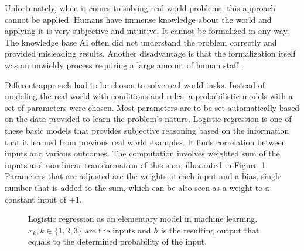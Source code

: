 Unfortunately, when it comes to solving real world problems, this approach cannot be applied. Humans have immense knowledge about the world and applying it is very subjective and intuitive. It cannot be formalized in any way. The knowledge base AI often did not understand the problem correctly and provided misleading results. Another disadvantage is that the formalization itself was an unwieldy process requiring a large amount of human staff \cite{Goodfellow-et-al-2016}.

Different approach had to be chosen to solve real world tasks. Instead of modeling the real world with conditions and rules, a probabilistic models with a set of parameters were chosen. Most parameters are to be set automatically based on the data provided to learn the problem's nature. Logistic regression is one of these basic models that provides subjective reasoning based on the information that it learned from previous real world examples. It finds correlation between inputs and various outcomes. The computation involves weighted sum of the inputs and non-linear transformation of this sum, illustrated in Figure~\ref{fig:neuron}. Parameters that are adjusted are the weights of each input and a bias, single number that is added to the sum, which can be also seen as a weight to a constant input of $+1$.

\begin{figure}[!ht]
    \centering
    \caption{Logistic regression as an elementary model in machine learning. $x_{k}, k \in \{1, 2, 3\}$ are the inputs and $h$ is the resulting output that equals to the determined probability of the input.}
    \label{fig:neuron}
\end{figure}

